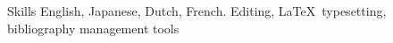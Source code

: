
\begin{rubric}{Skills}
	English, Japanese, Dutch, French.
	Editing, \LaTeX\ typesetting, bibliography management tools 
\end{rubric}